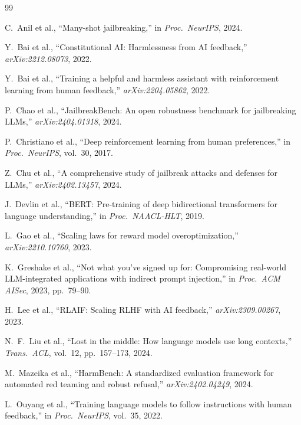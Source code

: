 \documentclass[conference]{IEEEtran}
\begin{document}
\begin{thebibliography}{99}
\small

C.\ Anil et al., ``Many-shot jailbreaking,'' in \textit{Proc.\ NeurIPS}, 2024.

Y.\ Bai et al., ``Constitutional AI: Harmlessness from AI feedback,''
\textit{arXiv:2212.08073}, 2022.

Y.\ Bai et al., ``Training a helpful and harmless assistant with reinforcement
learning from human feedback,'' \textit{arXiv:2204.05862}, 2022.

P.\ Chao et al., ``JailbreakBench: An open robustness benchmark for
jailbreaking LLMs,'' \textit{arXiv:2404.01318}, 2024.

P.\ Christiano et al., ``Deep reinforcement learning from human preferences,''
in \textit{Proc.\ NeurIPS}, vol.\ 30, 2017.

Z.\ Chu et al., ``A comprehensive study of jailbreak attacks and defenses for
LLMs,'' \textit{arXiv:2402.13457}, 2024.

J.\ Devlin et al., ``BERT: Pre-training of deep bidirectional transformers for
language understanding,'' in \textit{Proc.\ NAACL-HLT}, 2019.

L.\ Gao et al., ``Scaling laws for reward model overoptimization,''
\textit{arXiv:2210.10760}, 2023.

K.\ Greshake et al., ``Not what you've signed up for: Compromising
real-world LLM-integrated applications with indirect prompt injection,''
in \textit{Proc.\ ACM AISec}, 2023, pp.\ 79--90.

H.\ Lee et al., ``RLAIF: Scaling RLHF with AI feedback,''
\textit{arXiv:2309.00267}, 2023.

N.\ F.\ Liu et al., ``Lost in the middle: How language models use long
contexts,'' \textit{Trans.\ ACL}, vol.\ 12, pp.\ 157--173, 2024.

M.\ Mazeika et al., ``HarmBench: A standardized evaluation framework for
automated red teaming and robust refusal,'' \textit{arXiv:2402.04249}, 2024.

L.\ Ouyang et al., ``Training language models to follow instructions with
human feedback,'' in \textit{Proc.\ NeurIPS}, vol.\ 35, 2022.


\end{thebibliography}
\end{document}
